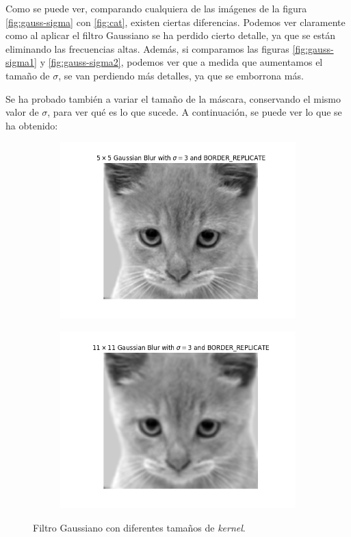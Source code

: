 \documentclass[11pt,a4paper]{article}
\begin{document}
Como se puede ver, comparando cualquiera de las imágenes de la figura \ref{fig:gauss-sigma} con \ref{fig:cat}, existen ciertas
diferencias. Podemos ver claramente como al aplicar el filtro Gaussiano se ha perdido cierto detalle, ya que se están
eliminando las frecuencias altas. Además, si comparamos las figuras \ref{fig:gauss-sigma1} y \ref{fig:gauss-sigma2}, podemos
ver que a medida que aumentamos el tamaño de $\sigma$, se van perdiendo más detalles, ya que se emborrona más.

Se ha probado también a variar el tamaño de la máscara, conservando el mismo valor de $\sigma$, para ver qué es lo que sucede.
A continuación, se puede ver lo que se ha obtenido:

\begin{figure}[H]
\begin{subfigure}{.5\textwidth}
	\centering
	\includegraphics[scale=0.48]{img/gauss-sigma2.png}
	\label{fig:gauss-sigma3}
\end{subfigure}
\begin{subfigure}{.5\textwidth}
	\centering
	\includegraphics[scale=0.48]{img/gauss-size.png}
	\label{fig:gauss-size1}
\end{subfigure}
\caption{Filtro Gaussiano con diferentes tamaños de \textit{kernel}.}
\label{fig:gauss-size}
\end{figure}
\end{document}
